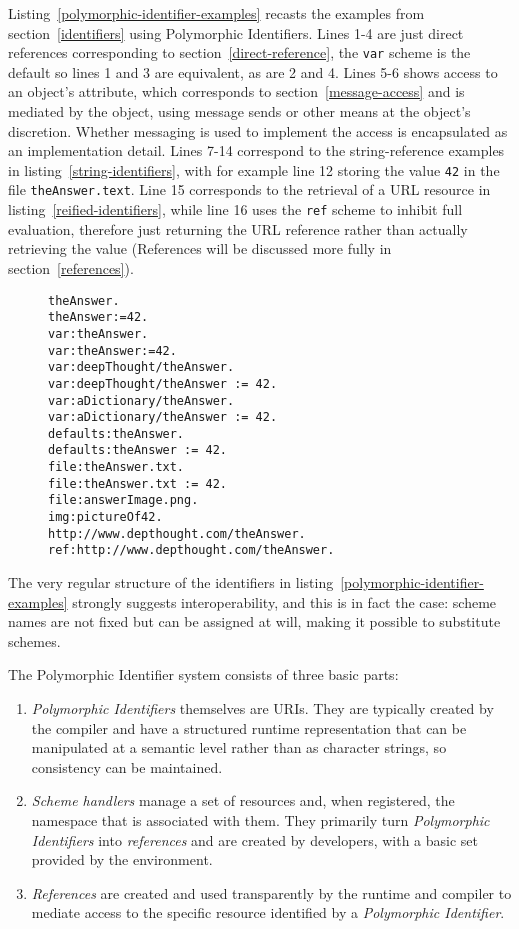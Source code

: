 \documentclass[preprint,authoryear]{llncs}
\begin{document}
Listing~\ref{polymorphic-identifier-examples} recasts the examples from section~\ref{identifiers} using
Polymorphic Identifiers.  Lines 1-4 are just direct references corresponding to section~\ref{direct-reference},
the {\tt var} scheme is the default so lines 1 and 3 are equivalent, as are 2 and 4.
Lines 5-6 shows access to an object's attribute, which corresponds to section~\ref{message-access} and is
mediated by the object, using message sends or other means at the object's discretion.  Whether messaging
is used to implement the access is encapsulated as an implementation detail.  Lines 7-14 correspond
to the string-reference examples in listing~\ref{string-identifiers}, with for example line 12 storing the
value {\tt 42} in the file {\tt theAnswer.text}.   Line 15 corresponds to the retrieval of a URL resource in listing~\ref{reified-identifiers}, while line 16 uses the {\tt ref} scheme to inhibit full evaluation, therefore just returning the
URL reference rather than actually retrieving the value (References will be discussed more fully in section~\ref{references}).

\begin{figure}[htbp]
\begin{lstlisting}[style=numbers,label=polymorphic-identifier-examples,caption=Some variants of Polymorphic Identifiers.]
theAnswer.
theAnswer:=42.
var:theAnswer.
var:theAnswer:=42.
var:deepThought/theAnswer.
var:deepThought/theAnswer := 42.
var:aDictionary/theAnswer.
var:aDictionary/theAnswer := 42.
defaults:theAnswer.
defaults:theAnswer := 42.
file:theAnswer.txt.
file:theAnswer.txt := 42.
file:answerImage.png.
img:pictureOf42.
http://www.depthought.com/theAnswer.
ref:http://www.depthought.com/theAnswer.
\end{lstlisting}
\end{figure}

The very regular structure of the identifiers in listing~\ref{polymorphic-identifier-examples} strongly
suggests interoperability, and this is in fact the case:  scheme names are not fixed but can be
assigned at will, making it possible to substitute schemes.

The Polymorphic Identifier system consists of three basic parts:
\begin{enumerate}
\item \emph{Polymorphic Identifiers} themselves are URIs.  They are typically created by the 
	compiler and have a structured runtime representation that can be manipulated
	at a semantic level rather than as character strings, so consistency can be 
	maintained.
\item \emph{Scheme handlers} manage a set of resources and, when registered,
	 the namespace that is associated
	with them.  They primarily turn \emph{Polymorphic Identifiers} into \emph{references} and
	are created by developers, with a basic set provided by the environment.
\item \emph{References} are created and used transparently by the runtime and compiler
	to mediate access to the specific resource identified by a \emph{Polymorphic Identifier}.
	
	
\end{enumerate}
\end{document}
